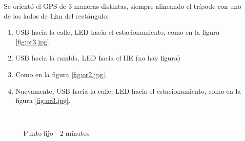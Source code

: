 \documentclass[main]{subfiles}
\begin{document}
Se orientó el GPS de 3 maneras distintas, siempre alineando el trípode con uno de los lados de 12m del rectángulo:

\begin{enumerate}
\item USB hacia la calle, LED hacia el estacionamiento, como en la figura \ref{fig:or3.jpg}.
\item USB hacia la rambla, LED hacia el IIE (no hay figura)
\item Como en la figura \ref{fig:or2.jpg}.
\item Nuevamente, USB hacia la calle, LED hacia el estacionamiento, como en la figura \ref{fig:or3.jpg}.
\end{enumerate}

\begin{figure}[h!]
\caption{Punto fijo - 2 minutos}
  \hspace{-50pt}
  \\


\end{figure}
\end{document}
